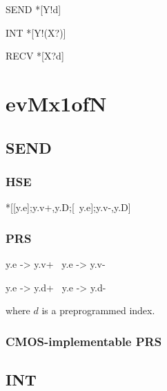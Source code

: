 \documentclass{article}
\begin{document}

\begin{csp}
SEND\equiv
*[Y!d]

INT\equiv
*[Y!(X?)]

RECV\equiv
*[X?d]
\end{csp}

\section{evMx1ofN}

\subsection{SEND}

\subsubsection{HSE}

\begin{hse}
*[[y.e];y.v+,y.D\!\Uparrow;[~y.e];y.v-,y.D\!\Downarrow]
\end{hse}

\subsubsection{PRS}

\begin{prs2}
y.e -> y.v+
~y.e -> y.v-

y.e -> y.d+
~y.e -> y.d-
\end{prs2}

where $d$ is a preprogrammed index.

\subsubsection{CMOS-implementable PRS}

\subsection{INT}

\end{document}
